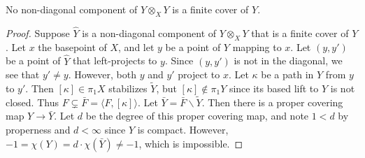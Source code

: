 \documentclass[10pt,a4paper]{amsart}
\newcommand{\euler}{\chi}
\begin{document}
\begin{lem}\label{no cover}
    No  non-diagonal component of $Y\otimes_X Y$ is a finite cover of $Y$.
\end{lem}

\begin{proof}
Suppose $\widehat Y$ is a non-diagonal component of $Y\otimes_X Y$
that is a finite cover of $Y$.
Let  $x$ the basepoint of $X$, and let $y$ be a point of $Y$ mapping to $x$.
Let $(y,y')$ be a point of $\widehat Y$ that left-projects to $y$.
Since $(y,y')$ is not in the diagonal, we see that $y'\neq y$.
However, both $y$ and $y'$ project to $x$.
Let $\kappa$ be a path in $Y$ from $y$ to $y'$.
Then $[\kappa]\in \pi_1X$ stabilizes $\widetilde Y$,
but $[\kappa]\notin \pi_1Y$ since its based lift to $Y$ is not closed.
Thus $F\subsetneq \bar F= \langle F, [\kappa]\rangle$.
Let $\bar Y=\bar F \backslash \widetilde Y$.
Then there is a proper covering map $Y\rightarrow \bar Y$.
Let $d$ be the degree of this proper covering map, and note $1<d$ by properness
and $d<\infty$ since $Y$ is compact.
However, $-1 = \euler(Y)= d\cdot\euler(\bar Y) \neq -1$, which is impossible.
\end{proof}
\end{document}
